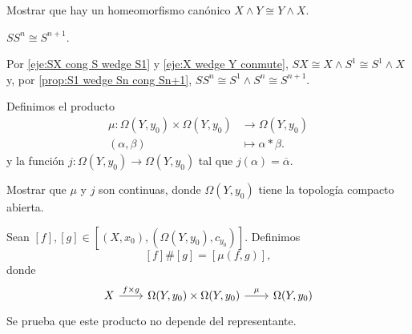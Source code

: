\begin{ejercicio}
\label{eje:X wedge Y conmute}
    Mostrar que hay un homeomorfismo canónico $X\wedge Y\cong Y\wedge X$.
\end{ejercicio}
\begin{coro}
\label{coro:SS^n cong Sn+1}
    $SS^n\cong S^{n+1}$.
\end{coro}
\begin{dem}
    Por \ref{eje:SX cong S wedge S1} y \ref{eje:X wedge Y conmute}, $SX\cong X\wedge S^1\cong S^1\wedge X$ y, por \ref{prop:S1 wedge Sn cong Sn+1}, $SS^n\cong S^1\wedge S^n\cong S^{n+1}$.
\end{dem}
\begin{definicion}
    Definimos el producto 
    \begin{align*}
        \mu:\Omega(Y,y_0)\times\Omega(Y,y_0)&\to \Omega(Y,y_0)\\
        (\alpha,\beta)&\mapsto \alpha*\beta.
    \end{align*}
    y la función $j:\Omega(Y,y_0)\to\Omega(Y,y_0)$ tal que $j(\alpha)=\overline{\alpha}$.
\end{definicion}
\begin{ejercicio}
    Mostrar que $\mu$ y $j$ son continuas, donde $\Omega(Y,y_0)$ tiene la topología compacto abierta.
\end{ejercicio}
\begin{definicion}
    Sean $[f],[g]\in [(X,x_0),(\Omega(Y,y_0),c_{y_0})]$. Definimos
    \[
    [f]\#[g]=[\mu(f,g)],
    \]
    donde 
    \begin{equation*}
        \begin{tikzcd}[column sep=0.75cm]
            X\arrow[r, "f\times g"] & \Omega(Y,y_0)\times\Omega(Y,y_0)\arrow[r, "\mu"] & \Omega(Y,y_0)
        \end{tikzcd}
    \end{equation*}
    Se prueba que este producto no depende del representante.
\end{definicion}
